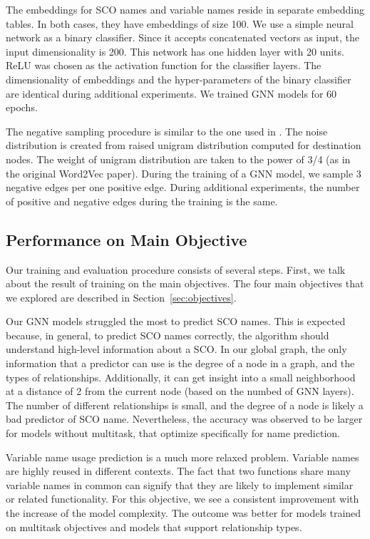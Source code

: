 \documentclass[a4paper,twoside]{article}
\begin{document}
The embeddings for SCO names and variable names reside in separate embedding tables. In both cases, they have embeddings of size 100. We use a simple neural network as a binary classifier. Since it accepts concatenated vectors as input, the input dimensionality is 200. This network has one hidden layer with 20 units. ReLU was chosen as the activation function for the classifier layers. The dimensionality of embeddings and the hyper-parameters of the binary classifier are identical during additional experiments. We trained GNN models for 60 epochs.

The negative sampling procedure is similar to the one used in \cite{mikolov2013distributed}. The noise distribution is created from raised unigram distribution computed for destination nodes. The weight of unigram distribution are taken to the power of 3/4 (as in the original Word2Vec paper). During the training of a GNN model, we sample 3 negative edges per one positive edge. During additional experiments, the number of positive and negative edges during the training is the same.

\subsection{Performance on Main Objective}

Our training and evaluation procedure consists of several steps. First, we talk about the result of training on the main objectives. The four main objectives that we explored are described in Section~\ref{sec:objectives}. 

Our GNN models struggled the most to predict SCO names. This is expected because, in general, to predict SCO names correctly, the algorithm should understand high-level information about a SCO\@. In our global graph, the only information that a predictor can use is the degree of a node in a graph, and the types of relationships. Additionally, it can get insight into a small neighborhood at a distance of 2 from the current node (based on the numbed of GNN layers). The number of different relationships is small, and the degree of a node is likely a bad predictor of SCO name. Nevertheless, the accuracy was observed to be larger for models without multitask, that optimize specifically for name prediction.

Variable name usage prediction is a much more relaxed problem. Variable names are highly reused in different contexts. The fact that two functions share many variable names in common can signify that they are likely to implement similar or related functionality. For this objective, we see a consistent improvement with the increase of the model complexity. The outcome was better for models trained on multitask objectives and models that support relationship types.
\end{document}
